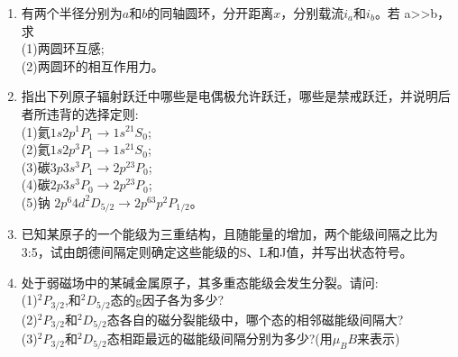 \begin{enumerate}
\begin{figure}[ht]
\caption{} \label{fig_ZKD16A_3}
\end{figure}
\item 有两个半径分别为$a$和$b$的同轴圆环，分开距离$x$，分别载流$i_a$和$i_b$。若 a>>b，求\\
(1)两圆环互感;\\
(2)两圆环的相互作用力。
\item 指出下列原子辐射跃迁中哪些是电偶极允许跃迁，哪些是禁戒跃迁，并说明后者所违背的选择定则:\\
(1)氦$1s2p^1P_1 \to 1s^{21}S_0$;\\
(2)氦$1s2p^3P_1 \to 1s^{21}S_0$;\\
(3)碳$3p3s^3P_1\to 2p^{23}P_0$;\\
(4)碳$2p3s^3P_0 \to 2p^{23}P_0$;\\
(5)钠 $2p^6 4d^2D_{5/2} \to 2p^63p^2P_{1/2}$。
\item 已知某原子的一个能级为三重结构，且随能量的增加，两个能级间隔之比为3:5，试由朗德间隔定则确定这些能级的S、L和J值，并写出状态符号。
\item 处于弱磁场中的某碱金属原子，其多重态能级会发生分裂。请问:\\
(1)$^2P_{3/2}$,和$^2D_{5/2}$态的g因子各为多少?\\
(2)$^2P_{3/2}$和$^2D_{5/2}$态各自的磁分裂能级中，哪个态的相邻磁能级间隔大?\\
(3)$^2P_{3/2}$和$^2D_{5/2}$态相距最远的磁能级间隔分别为多少?(用$\mu_B B$来表示)

\end{enumerate}